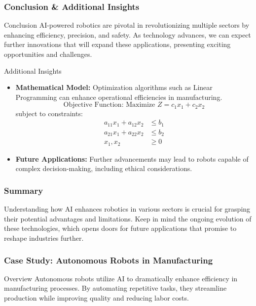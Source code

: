 \documentclass[aspectratio=169]{beamer}
\begin{document}
\begin{frame}[fragile]
    \frametitle{Conclusion & Additional Insights}
    \begin{block}{Conclusion}
        AI-powered robotics are pivotal in revolutionizing multiple sectors by enhancing efficiency, precision, and safety. As technology advances, we can expect further innovations that will expand these applications, presenting exciting opportunities and challenges.
    \end{block}

    \begin{block}{Additional Insights}
        \begin{itemize}
            \item \textbf{Mathematical Model:} Optimization algorithms such as Linear Programming can enhance operational efficiencies in manufacturing.
            \begin{equation}
            \text{Objective Function: Maximize } Z = c_1x_1 + c_2x_2
            \end{equation}
            subject to constraints:
            \begin{equation}
            \begin{align*}
            a_{11}x_1 + a_{12}x_2 & \leq b_1 \\
            a_{21}x_1 + a_{22}x_2 & \leq b_2 \\
            x_1, x_2 & \geq 0
            \end{align*}
            \end{equation}
            \item \textbf{Future Applications:} Further advancements may lead to robots capable of complex decision-making, including ethical considerations.
        \end{itemize}
    \end{block}
\end{frame}

\begin{frame}[fragile]
   \frametitle{Summary}
   Understanding how AI enhances robotics in various sectors is crucial for grasping their potential advantages and limitations. 
   Keep in mind the ongoing evolution of these technologies, which opens doors for future applications that promise to reshape industries further.
\end{frame}

\begin{frame}[fragile]
    \frametitle{Case Study: Autonomous Robots in Manufacturing}
    
    \begin{block}{Overview}
        Autonomous robots utilize AI to dramatically enhance efficiency in manufacturing processes. 
        By automating repetitive tasks, they streamline production while improving quality and reducing labor costs.
    \end{block}
\end{frame}
\end{document}
